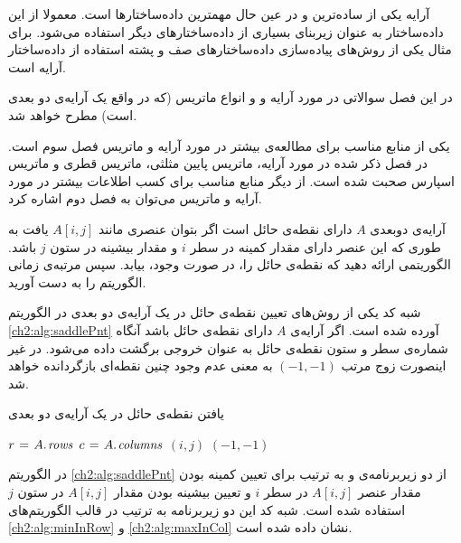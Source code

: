 

آرایه یکی از ساده‌ترین و در عین حال مهمترین داده‌ساختارها است. معمولا از این داده‌ساختار به عنوان زیربنای بسیاری از داده‌ساختارهای دیگر استفاده می‌شود. برای مثال یکی از روش‌های پیاده‌سازی داده‌ساختارهای صف و پشته استفاده از داده‌ساختار آرایه است.

در این فصل سوالاتی در مورد آرایه و و انواع ماتریس (که در واقع یک آرایه‌ی دو بعدی است) مطرح خواهد شد.

یکی از منابع مناسب برای مطالعه‌ی بیشتر در مورد آرایه و ماتریس فصل سوم {\cite{ebrahimi}} است. در فصل ذکر شده در مورد آرایه، ماتریس‌ پایین مثلثی، ماتریس‌ قطری و ماتریس اسپارس صحبت شده است. از دیگر منابع مناسب برای کسب اطلاعات بیشتر در مورد آرایه و ماتریس می‌توان به فصل دوم {\cite{horowitz}} اشاره کرد.


 آرایه‌ی دوبعدی {$A$} دارای نقطه‌ی حائل است اگر بتوان عنصری مانند {$A[i,j]$} یافت به طوری که این عنصر دارای مقدار کمینه در سطر {$i$} و مقدار بیشینه در ستون {$j$} باشد. الگوریتمی ارائه دهید که نقطه‌ی حائل را، در صورت وجود، بیابد. سپس مرتبه‌ی زمانی الگوریتم را به دست آورید.


شبه کد یکی از روش‌های تعیین نقطه‌ی حائل در یک آرایه‌ی دو بعدی در الگوریتم {\eqref{ch2:alg:saddlePnt}} آورده شده است. اگر آرایه‌ی {$A$} دارای نقطه‌ی حائل باشد آنگاه شماره‌ی سطر و ستون نقطه‌ی حائل به عنوان خروجی برگشت داده می‌شود. در غیر اینصورت زوج مرتب {$(-1,-1)$} به معنی عدم وجود چنین نقطه‌ای بازگردانده خواهد شد.
\begin{algorithm}
\caption{یافتن نقطه‌ی حائل در یک آرایه‌ی دو بعدی}\label{ch2:alg:saddlePnt}
\begin{latin}
\begin{algorithmic}[1]
		\State	$r\mathrel{\hspace{1pt}=\hspace{1pt}} A.\hspace*{1pt}\mathit{rows}$
		\State	$c\mathrel{\hspace{1pt}=\hspace{1pt}} A.\hspace*{1pt}\mathit{columns}$		
										\State	\Return $(i,j)$
								\EndIf
						\EndIf
				\EndFor
		\EndFor
		\State	\Return $(-1,-1)$
\EndFunction
\end{algorithmic}
\end{latin}
\end{algorithm}

در الگوریتم {\eqref{ch2:alg:saddlePnt}} از دو زیربرنامه‌ی {} و {} به ترتیب برای تعیین کمینه بودن مقدار عنصر {$A[i,j]$} در سطر {$i$} و تعیین بیشینه بودن مقدار {$A[i,j]$} در ستون {$j$} استفاده شده است. شبه کد این دو زیربرنامه به ترتیب در قالب الگوریتم‌های {\eqref{ch2:alg:minInRow}} و {\eqref{ch2:alg:maxInCol}} نشان داده شده است.

